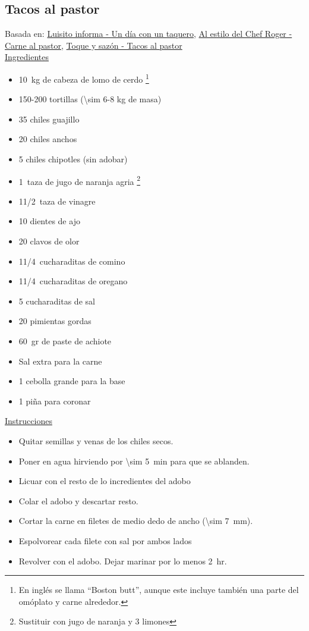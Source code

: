 \subsection{Tacos al pastor}

Basada en: \href{https://www.youtube.com/watch?v=W03EIyBCOPI&list=LL70vwP7i8PV9gx3t6SvBbRQ&index=598}{Luisito informa - Un día con un taquero}, \href{https://www.youtube.com/watch?v=F7N3l6XGn-0}{Al estilo del Chef Roger - Carne al pastor},
\href{https://www.youtube.com/watch?v=pmzl92R3rJk}{Toque y sazón - Tacos al pastor}\\

\underline{Ingredientes}

\begin{itemize}
\item \SI{10}{kg} de cabeza de lomo de cerdo \footnote{En inglés se llama ``Boston butt'', aunque este incluye también una parte del omóplato y carne alrededor.}
\item 150-200 tortillas (\num{\sim 6}-8 kg de masa)
\item 35 chiles guajillo
\item 20 chiles anchos
\item 5 chiles chipotles (sin adobar)
\item \SI{1}{taza} de jugo de naranja agria \footnote{Sustituir con jugo de naranja y 3 limones}
\item 1\SI{1/2}{taza} de vinagre
\item 10 dientes de ajo
\item 20 clavos de olor
\item 1\SI{1/4}{cucharaditas} de comino
\item 1\SI{1/4}{cucharaditas} de oregano
\item 5 cucharaditas de sal
\item 20 pimientas gordas
\item \SI{60}{gr} de paste de achiote
\item Sal extra para la carne
\item 1 cebolla grande para la base
\item 1 piña para coronar
\end{itemize}

\underline{Instrucciones}
\begin{itemize}
\item Quitar semillas y venas de los chiles secos.
\item Poner en agua hirviendo por \SI{\sim 5}{min} para que se ablanden.
\item Licuar con el resto de lo incredientes del adobo
\item Colar el adobo y descartar resto.
\item Cortar la carne en filetes de medio dedo de ancho (\SI{\sim 7}{mm}).
\item Espolvorear cada filete con sal por ambos lados
\item Revolver con el adobo. Dejar marinar por lo menos \SI{2}{hr}.
\end{itemize}

